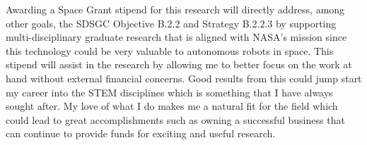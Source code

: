 Awarding a Space Grant stipend for this research will directly address, among other goals, the SDSGC Objective B.2.2 and Strategy B.2.2.3 by supporting multi-disciplinary graduate research that is aligned with NASA's mission since this technology could be very valuable to autonomous robots in space. This stipend will assist in the research by allowing me to better focus on the work at hand without external financial concerns. Good results from this could jump start my career into the STEM disciplines which is something that I have always sought after. My love of what I do makes me a natural fit for the field which could lead to great accomplishments such as owning a successful business that can continue to provide funds for exciting and useful research.